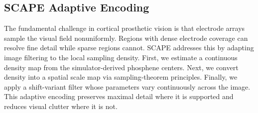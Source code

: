 \subsection{SCAPE Adaptive Encoding}

The fundamental challenge in cortical prosthetic vision is that electrode arrays sample the visual field nonuniformly. Regions with dense electrode coverage can resolve fine detail while sparse regions cannot. SCAPE addresses this by adapting image filtering to the local sampling density. First, we estimate a continuous density map from the simulator-derived phosphene centers. Next, we convert density into a spatial scale map via sampling-theorem principles. Finally, we apply a shift-variant filter whose parameters vary continuously across the image. This adaptive encoding preserves maximal detail where it is supported and reduces visual clutter where it is not.

